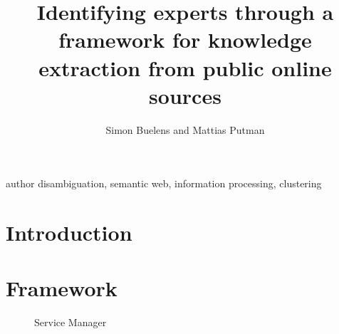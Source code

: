 \documentclass[9pt, twocolumn]{phdsymp} %
\begin{document}
\title{Identifying experts through a framework for knowledge extraction from public online sources} %

\author{Simon Buelens and Mattias Putman}


\maketitle

\begin{abstract} 


\end{abstract}

\begin{keywords}
author disambiguation, semantic web, information processing, clustering
\end{keywords}

\section{Introduction}


\section{Framework}

\begin{figure}
\centering
\caption{Service Manager}
\label{fig:architectuur}
\end{figure}
\end{document}
